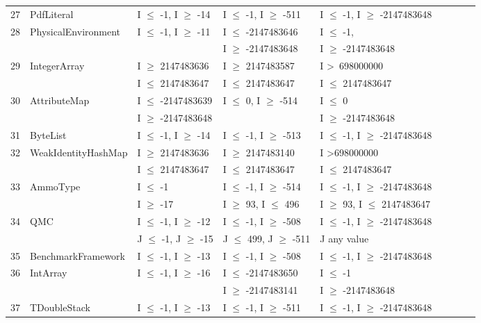 {\begin{longtable}{|l|l|l|l|l|l|l|l|l|}
27	& PdfLiteral					& I $\le$ -1, I $\ge$ -14			& I $\le$ -1, I $\ge$ -511			& I $\le$ -1, I $\ge$ -2147483648	\\ 
28	& PhysicalEnvironment		& I $\le$ -1, I $\ge$ -11			& I $\le$ -2147483646			& I $\le$ -1, 							\\ 
	& 							& 								& I $\ge$ -2147483648 			& I $\ge$ -2147483648				\\ 
29	& IntegerArray				& I $\ge$ 2147483636			& I $\ge$ 2147483587			& I \textgreater~698000000					\\ 
	&                                             & I $\le$ 2147483647			& I $\le$ 2147483647			&  I $\le$ 2147483647					\\	
30	& AttributeMap				& I $\le$ -2147483639			& I $\le$ 0, I $\ge$ -514			& I $\le$ 0								\\ 
	&                                             & I $\ge$ -2147483648			& 								& I $\ge$ -2147483648 			   	\\	
31	& ByteList					& I $\le$ -1, I $\ge$ -14			& I $\le$ -1, I $\ge$ -513			& I $\le$ -1, I $\ge$ -2147483648	\\ 
32	& WeakIdentityHashMap		& I $\ge$ 2147483636			& I $\ge$ 2147483140			& I \textgreater 698000000					\\ 
	&                                             & I $\le$ 2147483647			& I $\le$ 2147483647			& I $\le$ 2147483647					\\
33	& AmmoType				& I $\le$ -1						& I $\le$ -1, I $\ge$ -514			& I $\le$ -1, I $\ge$ -2147483648	\\ 			
	&                                             & I $\ge$ -17					& I $\ge$ 93, I $\le$ 496			& I $\ge$ 93, 	I $\le$ 2147483647	\\
34	& QMC						& I $\le$ -1, I $\ge$ -12			& I $\le$ -1, I $\ge$ -508			& I $\le$ -1, I $\ge$ -2147483648	\\ 
	&                                             & J $\le$ -1, J $\ge$ -15			& J $\le$ 499, J $\ge$ -511		& J any value			 		  				\\	
35	& BenchmarkFramework		& I $\le$ -1, I $\ge$ -13			& I $\le$ -1, I $\ge$ -508			& I $\le$ -1, I $\ge$ -2147483648	\\ 
36	& IntArray					& I $\le$ -1, I $\ge$ -16			& I $\le$ -2147483650			& I $\le$ -1								\\ 
	&							&								& I $\ge$ -2147483141			& I $\ge$ -2147483648				\\
37	& TDoubleStack				& I $\le$ -1, I $\ge$ -13			& I $\le$ -1, I $\ge$ -511			& I $\le$ -1, I $\ge$ -2147483648	\\ 

\end{longtable}}
